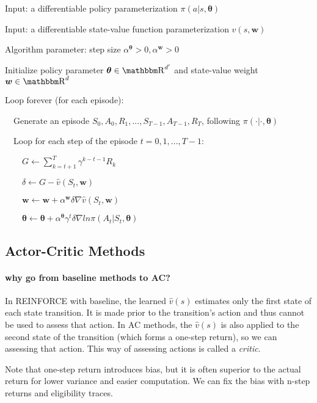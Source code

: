 \documentclass[sutton_barto_notes.tex]{subfiles}
\begin{document}
\begin{tcolorbox}[width=1.1\textwidth,title={REINFORCE with baseline (episodic) for estimating $\pi_*$}]
Input: a differentiable policy parameterization $\pi(a|s,\bm{\theta})$

Input: a differentiable state-value function parameterization $\hat{v}(s,\bm{w})$

Algorithm parameter: step size $\alpha^{\bm{\theta}} > 0, \alpha^{\bm{w}} > 0$

Initialize policy parameter $\bm{\theta} \in \R^{d'}$ and state-value weight $\bm{w} \in \R^d$

Loop forever (for each episode):

$\quad$Generate an episode $S_0,A_0,R_1,...,S_{T-1},A_{T-1},R_T$, following $\pi(\cdot|\cdot,\bm{\theta})$

$\quad$Loop for each step of the episode $t=0,1,...,T-1$:

$\quad\quad G\leftarrow\sum_{k=t+1}^T \gamma^{k-t-1}R_k$

$\quad\quad \delta\leftarrow G - \hat{v}(S_t, \bm{w})$

$\quad\quad \bm{w} \leftarrow \bm{w} + \alpha^{\bm{w}}\delta\nabla\hat{v}(S_t,\bm{w})$

$\quad\quad\bm{\theta}\leftarrow\bm{\theta}+\alpha^{\bm{\theta}}\gamma^t \delta \nabla ln\pi(A_t | S_t, \bm{\theta})$
\end{tcolorbox}


\subsection{Actor-Critic Methods}

\paragraph{why go from baseline methods to AC?} In REINFORCE with baseline, the learned $\hat{v}(s)$ estimates only the first state of each state transition. It is made prior to the transition's action and thus cannot be used to assess that action. In AC methods, the $\hat{v}(s)$ is also applied to the second state of the transition (which forms a one-step return), so we can assessing that action. This way of assessing actions is called a \textit{critic}.

Note that one-step return introduces bias, but it is often superior to the actual return for lower variance and easier computation. We can fix the bias with n-step returns and eligibility traces.
\end{document}

